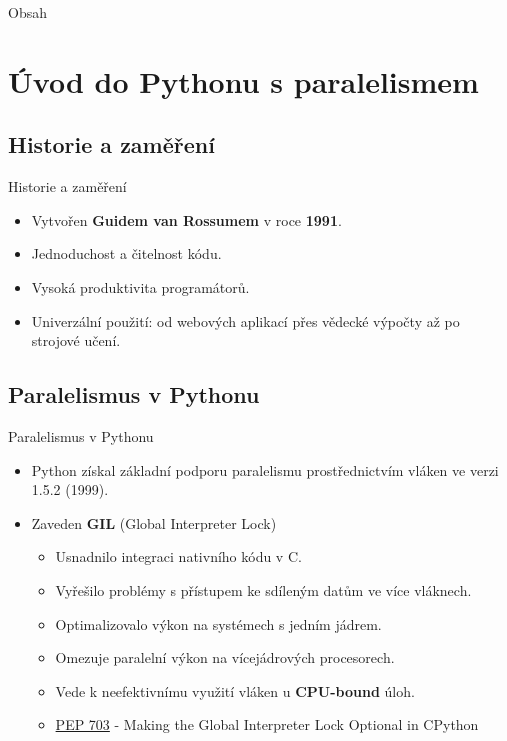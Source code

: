 \documentclass{beamer}
\title{\thesisname}
\author{\authorname}
\institute{Univerzita Palackého v Olomouci}
\date{\today}
\begin{document}
\begin{frame}
	\titlepage
\end{frame}

\begin{frame}{Obsah}
	\tableofcontents
\end{frame}

\section{Úvod do Pythonu s paralelismem}
\subsection{Historie a zaměření}
\begin{frame}{Historie a zaměření}
	\begin{itemize}
		\item Vytvořen \textbf{Guidem van Rossumem} v roce \textbf{1991}.
	\end{itemize}
	\begin{itemize}
		\item Jednoduchost a čitelnost kódu.
		\item Vysoká produktivita programátorů.
		\item Univerzální použití: od webových aplikací přes vědecké výpočty až po strojové učení.
	\end{itemize}
\end{frame}

\subsection{Paralelismus v Pythonu}
\begin{frame}{Paralelismus v Pythonu}
	\begin{itemize}
		\item Python získal základní podporu paralelismu prostřednictvím vláken ve verzi 1.5.2 (1999).
		\item Zaveden \textbf{GIL} (Global Interpreter Lock)
		\begin{itemize}
			\item [\textendash] Usnadnilo integraci nativního kódu v C.
			\item [\textendash] Vyřešilo problémy s přístupem ke sdíleným datům ve více vláknech.
			\item [\textendash] Optimalizovalo výkon na systémech s jedním jádrem.
			\item [\textendash] Omezuje paralelní výkon na vícejádrových procesorech.
			\item [\textendash] Vede k neefektivnímu využití vláken u \textbf{CPU-bound} úloh.
			\item [\textendash] \hypersetup{urlcolor=blue} \href{https://peps.python.org/pep-0703/}{PEP 703} - Making the Global Interpreter Lock Optional in CPython 
		\end{itemize}
	\end{itemize}
\end{frame}
\end{document}
